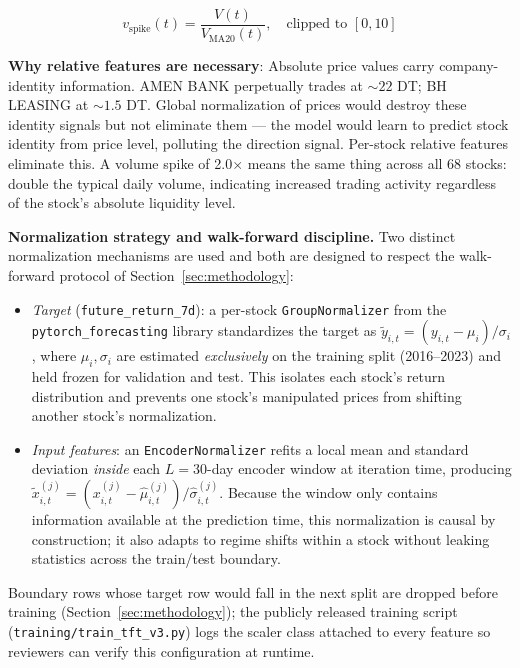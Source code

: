 \documentclass[conference]{IEEEtran}
\begin{document}
\begin{equation}
v_{\text{spike}}(t) = \frac{V(t)}{V_{\text{MA20}}(t)}, \quad \text{clipped to } [0, 10]
\label{eq:vol_spike}
\end{equation}

\textbf{Why relative features are necessary}: Absolute price values carry company-identity information. AMEN BANK perpetually trades at $\sim{}22$ DT; BH LEASING at $\sim{}1.5$ DT. Global normalization of prices would destroy these identity signals but not eliminate them --- the model would learn to predict stock identity from price level, polluting the direction signal. Per-stock relative features eliminate this. A volume spike of 2.0$\times$ means the same thing across all 68 stocks: double the typical daily volume, indicating increased trading activity regardless of the stock's absolute liquidity level.

\textbf{Normalization strategy and walk-forward discipline.}
Two distinct normalization mechanisms are used and both are designed
to respect the walk-forward protocol of Section~\ref{sec:methodology}:
\begin{itemize}
\item \textit{Target} (\texttt{future\_return\_7d}): a per-stock
\texttt{GroupNormalizer} from the \texttt{pytorch\_forecasting}
library standardizes the target as
$\tilde{y}_{i,t} = (y_{i,t} - \mu_i)/\sigma_i$, where
$\mu_i, \sigma_i$ are estimated \emph{exclusively} on the training
split (2016--2023) and held frozen for validation and test. This
isolates each stock's return distribution and prevents one stock's
manipulated prices from shifting another stock's normalization.
\item \textit{Input features}: an \texttt{EncoderNormalizer} refits a
local mean and standard deviation \emph{inside} each $L=30$-day
encoder window at iteration time, producing
$\tilde{x}_{i,t}^{(j)} = (x_{i,t}^{(j)} - \hat{\mu}_{i,t}^{(j)})
/\hat{\sigma}_{i,t}^{(j)}$. Because the window only contains
information available at the prediction time, this normalization is
causal by construction; it also adapts to regime shifts within a
stock without leaking statistics across the train/test boundary.
\end{itemize}
Boundary rows whose target row would fall in the next split are
dropped before training (Section~\ref{sec:methodology}); the publicly
released training script (\texttt{training/train\_tft\_v3.py}) logs
the scaler class attached to every feature so reviewers can verify
this configuration at runtime.
\end{document}
